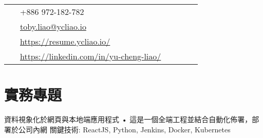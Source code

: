 \documentclass[10pt]{article} %
\begin{document}
\begin{paracol}{2}
\vspace{-\baselineskip}\bigskip\bigskip\bigskip\bigskip %


\switchcolumn %


\parbox[top][0.12\textheight][c]{\linewidth}{ %
	\vspace{-0.04\textheight} %
	\colorbox{shade}{ %
		\begin{supertabular}{p{0.05\linewidth}|p{0.775\linewidth}} %
			\raisebox{-1pt}{\faPhone} & +886 972-182-782 \\ %
			\raisebox{0pt}{\small\faEnvelope} & \href{mailto:toby.liao@ycliao.io}{toby.liao@ycliao.io} \\ %
			\raisebox{-1pt}{\small\faDesktop} & \href{https://resume.ycliao.io/}{https://resume.ycliao.io/} \\ %
			\raisebox{-1pt}{\faLinkedinSquare} & \href{https://linkedin.com/in/yu-cheng-liao/}{https://linkedin.com/in/yu-cheng-liao/} \\ %
		\end{supertabular}
	}
}



\section{實務專題} 

\longformdescriptionwithremind
{資料視象化於網頁與本地端應用程式}
{• 這是一個全端工程並結合自動化佈署，部署於公司內網}
{關鍵技術: ReactJS, Python, Jenkins, Docker, Kubernetes}


\end{paracol}
\end{document}
